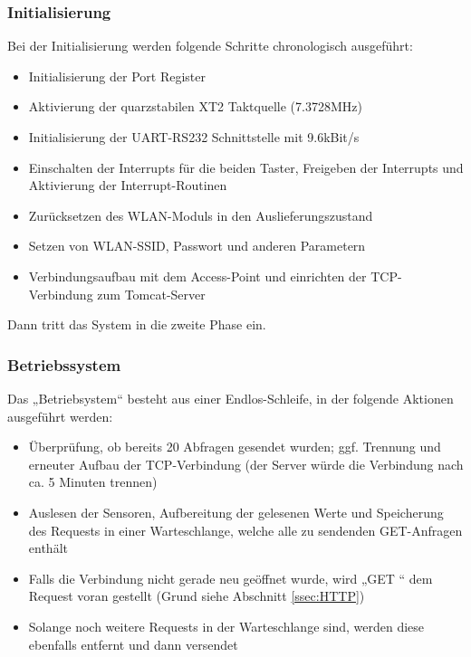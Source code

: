 \documentclass[12pt,a4paper,twoside]{article}
\begin{document}
\subsubsection{Initialisierung}
Bei der Initialisierung werden folgende Schritte chronologisch ausgeführt: 

\begin{itemize}
 \item Initialisierung der Port Register
 \item Aktivierung der quarzstabilen XT2 Taktquelle (7.3728MHz)
 \item Initialisierung der UART-RS232 Schnittstelle mit 9.6kBit/s
 \item Einschalten der Interrupts für die beiden Taster, Freigeben der Interrupts und  Aktivierung der Interrupt-Routinen
 \item Zurücksetzen des WLAN-Moduls in den Auslieferungszustand
 \item Setzen von WLAN-SSID, Passwort und anderen Parametern
 \item Verbindungsaufbau mit dem Access-Point und einrichten der TCP-Verbindung zum Tomcat-Server
\end{itemize}
Dann tritt das System in die zweite Phase ein.

\subsubsection{Betriebssystem}

Das „Betriebsystem“ besteht aus einer Endlos-Schleife, in der folgende Aktionen ausgeführt werden:
\begin{itemize}
 \item Überprüfung, ob bereits 20 Abfragen gesendet wurden; ggf. Trennung und erneuter Aufbau der TCP-Verbindung (der Server würde die Verbindung nach ca. 5 Minuten trennen)
 \item Auslesen der Sensoren, Aufbereitung der gelesenen Werte und Speicherung des Requests in einer Warteschlange, welche alle zu sendenden GET-Anfragen enthält
 \item Falls die Verbindung nicht gerade neu geöffnet wurde, wird „GET “ dem Request voran gestellt (Grund siehe Abschnitt \ref{ssec:HTTP})
 \item Solange noch weitere Requests in der Warteschlange sind, werden diese ebenfalls entfernt und dann versendet
\end{itemize}
\end{document}
